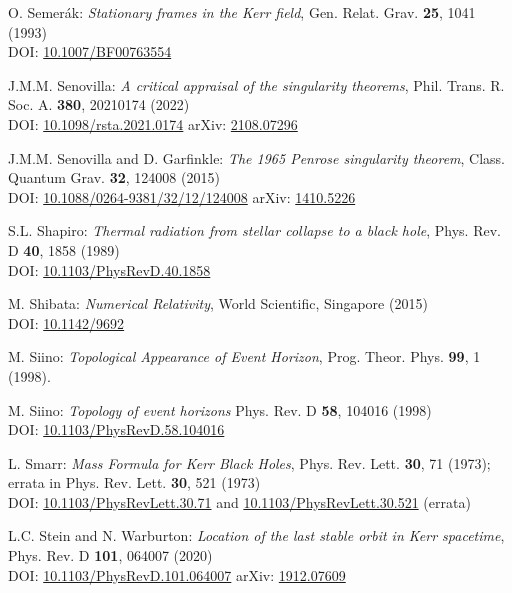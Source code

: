 \begin{thebibliography}{123}
O. Semer\'ak:
{\em Stationary frames in the Kerr field},
Gen. Relat. Grav. {\bf 25}, 1041 (1993)\\
DOI: \href{https://doi.org/10.1007/BF00763554}{10.1007/BF00763554}

J.M.M. Senovilla:
{\em A critical appraisal of the singularity theorems},
Phil. Trans. R. Soc. A. {\bf 380}, 20210174 (2022)\\
DOI: \href{https://doi.org/10.1098/rsta.2021.0174}{10.1098/rsta.2021.0174}\hfill
arXiv: \href{https://arxiv.org/abs/2108.07296}{2108.07296}

J.M.M. Senovilla and D. Garfinkle:
{\em The 1965 Penrose singularity theorem},
Class. Quantum Grav. {\bf 32}, 124008 (2015)\\
DOI: \href{https://doi.org/10.1088/0264-9381/32/12/124008}{10.1088/0264-9381/32/12/124008}\hfill
arXiv: \href{https://arxiv.org/abs/1410.5226}{1410.5226}

S.L. Shapiro:
{\em Thermal radiation from stellar collapse to a black hole},
Phys. Rev. D {\bf 40}, 1858 (1989)\\
DOI: \href{https://doi.org/10.1103/PhysRevD.40.1858}{10.1103/PhysRevD.40.1858}

M. Shibata:
{\em Numerical Relativity},
World Scientific, Singapore (2015)\\
DOI: \href{https://doi.org/10.1142/9692}{10.1142/9692}

M. Siino: {\em Topological Appearance of Event Horizon},
Prog. Theor. Phys. {\bf 99}, 1 (1998).

M. Siino: {\em Topology of event horizons}
Phys. Rev. D {\bf 58}, 104016 (1998)\\
DOI: \href{https://doi.org/10.1103/PhysRevD.58.104016}{10.1103/PhysRevD.58.104016}

L. Smarr: {\em Mass Formula for Kerr Black Holes},
Phys. Rev. Lett. {\bf 30}, 71 (1973); errata in Phys. Rev. Lett. {\bf 30}, 521 (1973)\\
DOI: \href{https://doi.org/10.1103/PhysRevLett.30.71}{10.1103/PhysRevLett.30.71}
and
\href{https://doi.org/10.1103/PhysRevLett.30.521}{10.1103/PhysRevLett.30.521} (errata)

L.C. Stein and N. Warburton:
{\em Location of the last stable orbit in Kerr spacetime},
Phys. Rev. D  {\bf 101}, 064007 (2020)\\
DOI: \href{https://doi.org/10.1103/PhysRevD.101.064007}{10.1103/PhysRevD.101.064007}\hfill
arXiv: \href{https://arxiv.org/abs/1912.07609}{1912.07609}


\end{thebibliography}
